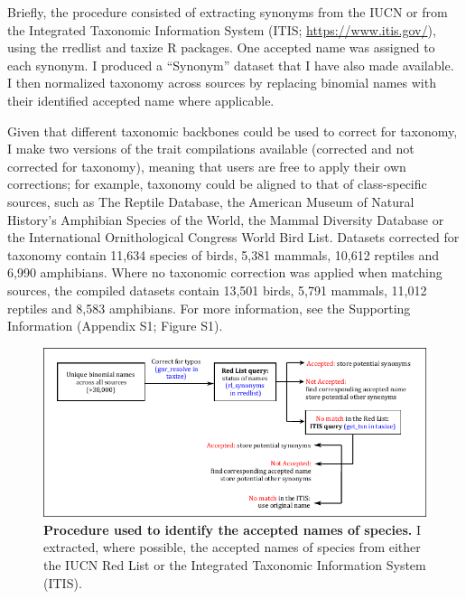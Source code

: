 Briefly, the procedure consisted of extracting synonyms from the IUCN \citep{IUCN2020} or from the Integrated Taxonomic Information System (ITIS; \url{https://www.itis.gov/}), using the rredlist \citep{rredlist} and taxize \citep{Chamberlain2013} R packages. One accepted name was assigned to each synonym. I produced a “Synonym” dataset that I have also made available. I then normalized taxonomy across sources by replacing binomial names with their identified accepted name where applicable.

Given that different taxonomic backbones could be used to correct for taxonomy, I make two versions of the trait compilations available (corrected and not corrected for taxonomy), meaning that users are free to apply their own corrections; for example, taxonomy could be aligned to that of class-specific sources, such as The Reptile Database, the American Museum of Natural History’s Amphibian Species of the World, the Mammal Diversity Database or the International Ornithological Congress World Bird List. Datasets corrected for taxonomy contain 11,634 species of birds, 5,381 mammals, 10,612 reptiles and 6,990 amphibians. Where no taxonomic correction was applied when matching sources, the compiled datasets contain 13,501 birds, 5,791 mammals, 11,012 reptiles and 8,583 amphibians. For more information, see the Supporting Information (Appendix S1; Figure S1).

\vskip 1cm
\begin{figure}[h!]
\centering
\includegraphics[scale=1.4]{figures/Chapter1/Taxonomic_corrections_chart}
\caption[Procedure used to identify the accepted names of species.]{\textbf{Procedure used to identify the accepted names of species.} I extracted, where possible, the accepted names of species from either the IUCN Red List or the Integrated Taxonomic Information System (ITIS).}
\label{chart_taxcor}
\end{figure}


